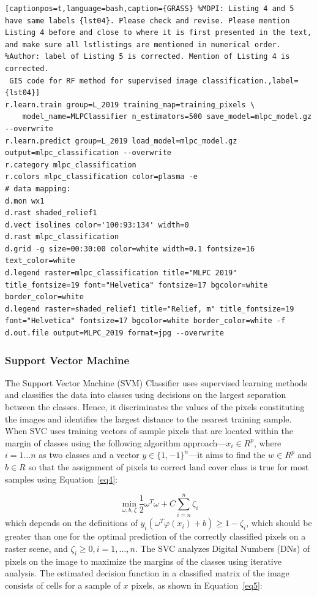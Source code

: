 \documentclass[jmse,article,accept,pdftex,oneauthor]{Definitions/mdpi}
\begin{document}
\begin{lstlisting}[captionpos=t,language=bash,caption={GRASS} %MDPI: Listing 4 and 5 have same labels {lst04}. Please check and revise. Please mention Listing 4 before and close to where it is first presented in the text, and make sure all lstlistings are mentioned in numerical order. 
%Author: label of Listing 5 is corrected. Mention of Listing 4 is corrected.
 GIS code for RF method for supervised image classification.,label={lst04}]
r.learn.train group=L_2019 training_map=training_pixels \
    model_name=MLPClassifier n_estimators=500 save_model=mlpc_model.gz --overwrite
r.learn.predict group=L_2019 load_model=mlpc_model.gz output=mlpc_classification --overwrite
r.category mlpc_classification
r.colors mlpc_classification color=plasma -e
# data mapping:
d.mon wx1
d.rast shaded_relief1
d.vect isolines color='100:93:134' width=0
d.rast mlpc_classification
d.grid -g size=00:30:00 color=white width=0.1 fontsize=16 text_color=white
d.legend raster=mlpc_classification title="MLPC 2019" title_fontsize=19 font="Helvetica" fontsize=17 bgcolor=white border_color=white
d.legend raster=shaded_relief1 title="Relief, m" title_fontsize=19 font="Helvetica" fontsize=17 bgcolor=white border_color=white -f
d.out.file output=MLPC_2019 format=jpg --overwrite
\end{lstlisting}
\vspace{-6pt} 

\subsubsection{Support Vector Machine}

The Support Vector Machine (SVM) Classifier  uses supervised learning methods~\cite{Cortes} and classifies the data into classes using decisions on the largest separation between the classes. Hence, it discriminates the values of the pixels constituting the images  and identifies the largest distance to the nearest training sample. When SVC uses training vectors of sample pixels that are located within the margin of classes using the following algorithm approach---$x_{i} \in R^p$, where $ i=1 \dots n$ as two classes and a vector $y \in \{1, - 1\}^n$---it aims to find the $w \in R^p$ and $b \in R$ so that the assignment of pixels to correct land cover class is true for most samples using   Equation~\eqref{eq4}:

\begin{equation}
\min_{\omega,b,\zeta}\frac{1}{2}\omega^T\omega+C\sum_{i=n}^{n}\zeta_{i}
\label{eq4}
\end{equation}
which depends on the definitions of $y_{i}(\omega^{T}\varphi (x_i) + b)\geq 1-\zeta_{i}$, which should be greater than one for the optimal prediction of the correctly classified pixels on a raster scene, and $\zeta_{i}\geq 0, i = 1,\dots,n$. The SVC analyzes Digital Numbers (DNs) of pixels on the image to maximize the margins of the classes using iterative analysis. The estimated decision function in a classified matrix of the image consists of cells for a sample of $x$ pixels, as shown in Equation~\eqref{eq5}:
\end{document}
